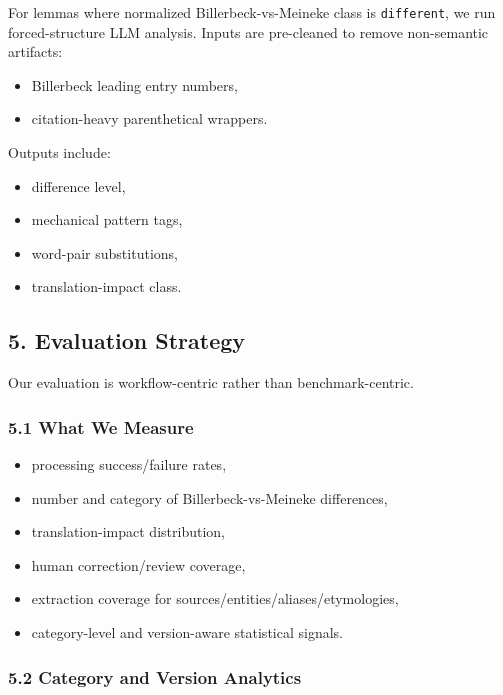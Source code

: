 \documentclass[
]{article}
\providecommand{\tightlist}{%
  \setlength{\itemsep}{0pt}\setlength{\parskip}{0pt}}
\begin{document}
For lemmas where normalized Billerbeck-vs-Meineke class is
\texttt{different}, we run forced-structure LLM analysis. Inputs are
pre-cleaned to remove non-semantic artifacts:

\begin{itemize}
\tightlist
\item
  Billerbeck leading entry numbers,
\item
  citation-heavy parenthetical wrappers.
\end{itemize}

Outputs include:

\begin{itemize}
\tightlist
\item
  difference level,
\item
  mechanical pattern tags,
\item
  word-pair substitutions,
\item
  translation-impact class.
\end{itemize}

\hypertarget{5-evaluation-strategy}{%
\subsection{5. Evaluation Strategy}\label{5-evaluation-strategy}}

Our evaluation is workflow-centric rather than benchmark-centric.

\hypertarget{51-what-we-measure}{%
\subsubsection{5.1 What We Measure}\label{51-what-we-measure}}

\begin{itemize}
\tightlist
\item
  processing success/failure rates,
\item
  number and category of Billerbeck-vs-Meineke differences,
\item
  translation-impact distribution,
\item
  human correction/review coverage,
\item
  extraction coverage for sources/entities/aliases/etymologies,
\item
  category-level and version-aware statistical signals.
\end{itemize}

\hypertarget{52-category-and-version-analytics}{%
\subsubsection{5.2 Category and Version
Analytics}\label{52-category-and-version-analytics}}
\end{document}

